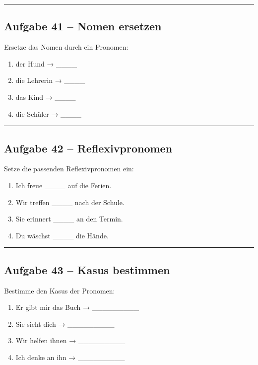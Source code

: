 \documentclass[a4paper,12pt]{article}
\newcommand{\linie}{\vspace{4pt}\hrule\vspace{10pt}}
\begin{document}
\linie

\subsection*{Aufgabe 41 – Nomen ersetzen}

Ersetze das Nomen durch ein Pronomen:

\begin{enumerate}
\item der Hund → \_\_\_\_
\item die Lehrerin → \_\_\_\_
\item das Kind → \_\_\_\_
\item die Schüler → \_\_\_\_
\end{enumerate}

\linie

\subsection*{Aufgabe 42 – Reflexivpronomen}

Setze die passenden Reflexivpronomen ein:

\begin{enumerate}
\item Ich freue \_\_\_\_ auf die Ferien.
\item Wir treffen \_\_\_\_ nach der Schule.
\item Sie erinnert \_\_\_\_ an den Termin.
\item Du wäschst \_\_\_\_ die Hände.
\end{enumerate}

\linie

\subsection*{Aufgabe 43 – Kasus bestimmen}

Bestimme den Kasus der Pronomen:

\begin{enumerate}
\item Er gibt mir das Buch → \_\_\_\_\_\_\_\_\_
\item Sie sieht dich → \_\_\_\_\_\_\_\_\_
\item Wir helfen ihnen → \_\_\_\_\_\_\_\_\_
\item Ich denke an ihn → \_\_\_\_\_\_\_\_\_
\end{enumerate}
\end{document}
